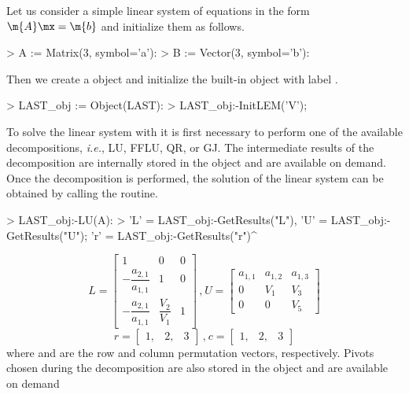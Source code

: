 \begin{example}
  Let us consider a simple linear system of equations in the form $\m{A}\mx = \m{b}$ and initialize them as follows.
  \begin{mapleinline}
> A := Matrix(3, symbol='a'):
> B := Vector(3, symbol='b'):
  \end{mapleinline}
  Then we create a \LAST{} object and initialize the built-in \LEM{} object with label .
  \begin{mapleinline}
> LAST_obj := Object(LAST):
> LAST_obj:-InitLEM('V');
  \end{mapleinline}
  To solve the linear system with \LAST{} it is first necessary to perform one of the available decompositions, \emph{i.e.}, \ac{LU}, \ac{FFLU}, QR, or \ac{GJ}. The intermediate results of the decomposition are internally stored in the \LAST{} object and are available on demand. Once the decomposition is performed, the solution of the linear system can be obtained by calling the  routine.
  \begin{mapleinline}
> LAST_obj:-LU(A):
> 'L' = LAST_obj:-GetResults("L"),    'U' = LAST_obj:-GetResults("U");
  'r' = LAST_obj:-GetResults("r")^%
  \end{mapleinline}
  \begin{equation*}
    L = \begin{bmatrix}
      1 & 0 & 0 \\
      -\dfrac{a_{2,1}}{a_{1,1}} & 1 & 0 \\
      -\dfrac{a_{2,1}}{a_{1,1}} & \dfrac{V_{2}}{V_{1}} & 1
    \end{bmatrix} \, \text{,} ~
    U = \begin{bmatrix}
      a_{1,1} & a_{1,2} & a_{1,3} \\
      0 & V_{1} & V_{3} \\
      0 & 0 & V_{5}
    \end{bmatrix}
  \end{equation*}
  \begin{equation*}
    r = \begin{bmatrix}
      1, & 2, & 3
    \end{bmatrix} \, \text{,} ~
    c = \begin{bmatrix}
      1, & 2, & 3
    \end{bmatrix}
  \end{equation*}
  where  and  are the row and column permutation vectors, respectively. Pivots chosen during the decomposition are also stored in the \LAST{} object and are available on demand

\end{example}
